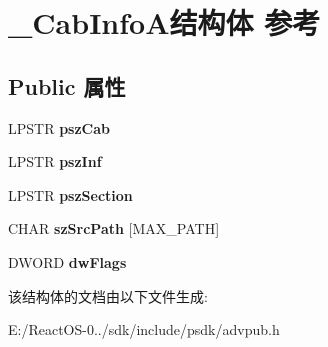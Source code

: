 \hypertarget{struct___cab_info_a}{}\section{\+\_\+\+Cab\+Info\+A结构体 参考}
\label{struct___cab_info_a}
\subsection*{Public 属性}
\begin{DoxyCompactItemize}
\item 
\mbox{\label{struct___cab_info_a_a5145a8c433650cfaa3e42ceac8d0c004}} 
L\+P\+S\+TR {\bfseries psz\+Cab}
\item 
\mbox{\label{struct___cab_info_a_ab87fd316e02e4c163baa0ba2d8334e14}} 
L\+P\+S\+TR {\bfseries psz\+Inf}
\item 
\mbox{\label{struct___cab_info_a_ab287aa2e2001e8450054c28439439be3}} 
L\+P\+S\+TR {\bfseries psz\+Section}
\item 
\mbox{\label{struct___cab_info_a_afd80df8a49a7d28ea09c138f79a82211}} 
C\+H\+AR {\bfseries sz\+Src\+Path} \mbox{[}M\+A\+X\+\_\+\+P\+A\+TH\mbox{]}
\item 
\mbox{\label{struct___cab_info_a_a8767de59f7bc8173f94e8bd0ae162202}} 
D\+W\+O\+RD {\bfseries dw\+Flags}
\end{DoxyCompactItemize}


该结构体的文档由以下文件生成\+:\begin{DoxyCompactItemize}
\item 
E\+:/\+React\+O\+S-\/0../sdk/include/psdk/advpub.\+h\end{DoxyCompactItemize}
